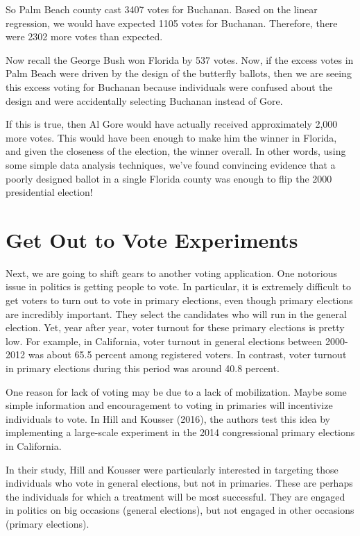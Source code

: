 \documentclass[
]{book}
\begin{document}
So Palm Beach county cast 3407 votes for Buchanan. Based on the linear regression, we would have expected 1105 votes for Buchanan. Therefore, there were 2302 more votes than expected.

Now recall the George Bush won Florida by 537 votes. Now, if the excess votes in Palm Beach were driven by the design of the butterfly ballots, then we are seeing this excess voting for Buchanan because individuals were confused about the design and were accidentally selecting Buchanan instead of Gore.

If this is true, then Al Gore would have actually received approximately 2,000 more votes. This would have been enough to make him the winner in Florida, and given the closeness of the election, the winner overall. In other words, using some simple data analysis techniques, we've found convincing evidence that a poorly designed ballot in a single Florida county was enough to flip the 2000 presidential election!

\section{Get Out to Vote Experiments}\label{get-out-to-vote-experiments}

Next, we are going to shift gears to another voting application. One notorious issue in politics is getting people to vote. In particular, it is extremely difficult to get voters to turn out to vote in primary elections, even though primary elections are incredibly important. They select the candidates who will run in the general election. Yet, year after year, voter turnout for these primary elections is pretty low. For example, in California, voter turnout in general elections between 2000-2012 was about 65.5 percent among registered voters. In contrast, voter turnout in primary elections during this period was around 40.8 percent.

One reason for lack of voting may be due to a lack of mobilization. Maybe some simple information and encouragement to voting in primaries will incentivize individuals to vote. In Hill and Kousser (2016)\citep{hill2016turning}, the authors test this idea by implementing a large-scale experiment in the 2014 congressional primary elections in California.

In their study, Hill and Kousser were particularly interested in targeting those individuals who vote in general elections, but not in primaries. These are perhaps the individuals for which a treatment will be most successful. They are engaged in politics on big occasions (general elections), but not engaged in other occasions (primary elections).
\end{document}
